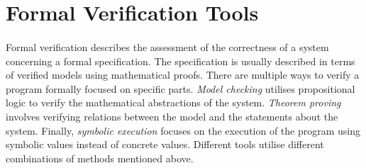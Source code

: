 \documentclass[oneside]{ecsproject}     %
\newcommand{\vref}[1]{\textit{\hyperref[#1]{#1}}}
\begin{document}








\section{Formal Verification Tools} \label{Chapter:FVT}
\paragraph*{}
Formal verification describes the assessment of the correctness of a system concerning a formal specification\cite{eth_formal_verification}. 
The specification is usually described
in terms of verified models using mathematical proofs. There are multiple ways to verify a program formally focused on specific parts. \textit{Model checking} utilises propositional logic 
to verify the mathematical abstractions of the system. \textit{Theorem proving} involves verifying
relations between the model and the statements about the system. Finally, \textit{symbolic execution} focuses
on the execution of the program using symbolic values instead of concrete values\cite{eth_formal_verification}.
Different tools utilise different combinations of methods mentioned above.
\end{document}
